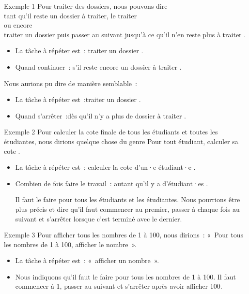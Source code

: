 \begin{hideedit}
\begin{frame}{Exemple 1}
  Pour traiter des dossiers, nous pouvons dire\\
  \og tant qu’il reste un dossier à traiter, le traiter \fg \\
  \pause
  ou encore\\
  \og traiter un dossier puis passer au suivant jusqu’à ce qu’il n’en 
  reste plus à traiter \fg.
  \pause
  \begin{itemize}
    \item La tâche à répéter est~: \pause \og traiter un dossier \fg.
    \item Quand continuer~: \pause \og s’il reste encore un dossier à traiter \fg.
  \end{itemize}
  \pause
  Nous aurions pu dire de manière semblable~:
  \begin{itemize}
    \item La tâche à répéter est~:\pause \og traiter un dossier \fg.
    \item Quand s'arrêter~:\pause \og dès qu'il n'y a plus de dossier à traiter \fg.
  \end{itemize}
\end{frame}

\begin{frame}{Exemple 2}
  Pour calculer la cote finale de tous les étudiants et toutes les étudiantes,
  nous dirions quelque chose du genre 
  \og Pour tout étudiant, calculer sa cote \fg.
  \begin{itemize}
  \item 
    La tâche à répéter est~: \og calculer la cote d’un·e étudiant·e \fg.
  \item
    Combien de fois faire le travail~: \og autant qu'il y a d'étudiant·es \fg.

    \pause
    Il faut le faire pour tous les étudiants et les étudiantes. Nous
    pourrions être plus précis et dire qu'il faut commencer au premier,
    passer à chaque fois au suivant et s'arrêter lorsque c'est terminé avec
    le dernier.
\end{itemize}
\end{frame}

\begin{frame}{Exemple 3}
  Pour afficher tous les nombres de 1 à 100, nous dirions~:
  «~Pour tous les nombres de 1 à 100, afficher le nombre~».
  \begin{itemize}
  \item
    La tâche à répéter est~: «~afficher un nombre~».
  \item 
    Nous indiquons qu'il faut le faire pour tous les nombres de 1 à 100. Il
    faut commencer à 1, passer au suivant et s'arrêter après avoir afficher
    100.
\end{itemize}
\end{frame}


\end{hideedit}
